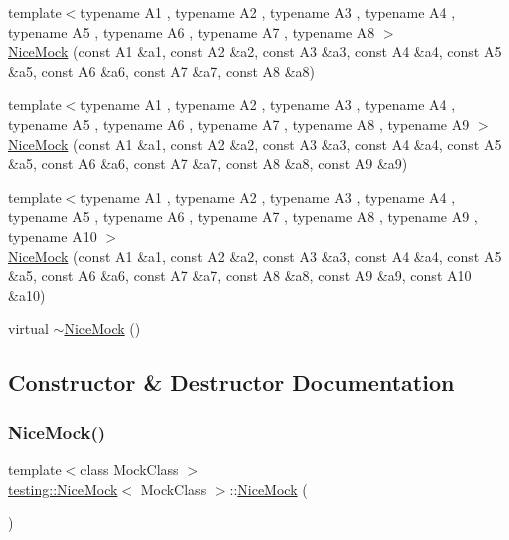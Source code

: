 \begin{DoxyCompactItemize}
\item 
{\footnotesize template$<$typename A1 , typename A2 , typename A3 , typename A4 , typename A5 , typename A6 , typename A7 , typename A8 $>$ }\\\hyperlink{classtesting_1_1_nice_mock_ae8792aab6c024a50886856bf1093eedc}{Nice\+Mock} (const A1 \&a1, const A2 \&a2, const A3 \&a3, const A4 \&a4, const A5 \&a5, const A6 \&a6, const A7 \&a7, const A8 \&a8)
\item 
{\footnotesize template$<$typename A1 , typename A2 , typename A3 , typename A4 , typename A5 , typename A6 , typename A7 , typename A8 , typename A9 $>$ }\\\hyperlink{classtesting_1_1_nice_mock_a61cfc9282222928590bcdaf851a806c6}{Nice\+Mock} (const A1 \&a1, const A2 \&a2, const A3 \&a3, const A4 \&a4, const A5 \&a5, const A6 \&a6, const A7 \&a7, const A8 \&a8, const A9 \&a9)
\item 
{\footnotesize template$<$typename A1 , typename A2 , typename A3 , typename A4 , typename A5 , typename A6 , typename A7 , typename A8 , typename A9 , typename A10 $>$ }\\\hyperlink{classtesting_1_1_nice_mock_a4baf1da52f4c892fc02f6ba10c0b8c02}{Nice\+Mock} (const A1 \&a1, const A2 \&a2, const A3 \&a3, const A4 \&a4, const A5 \&a5, const A6 \&a6, const A7 \&a7, const A8 \&a8, const A9 \&a9, const A10 \&a10)
\item 
virtual \hyperlink{classtesting_1_1_nice_mock_a4aaa6bd3850de6b6baa408010909a25f}{$\sim$\+Nice\+Mock} ()
\end{DoxyCompactItemize}


\subsection{Constructor \& Destructor Documentation}
\mbox{\label{classtesting_1_1_nice_mock_a10bbd6ebe779ac8ab1f9f3ae2dee9310}} 
\subsubsection{\texorpdfstring{Nice\+Mock()}{NiceMock()}\hspace{0.1cm}{\footnotesize\ttfamily [1/11]}}
{\footnotesize\ttfamily template$<$class Mock\+Class $>$ \\
\hyperlink{classtesting_1_1_nice_mock}{testing\+::\+Nice\+Mock}$<$ Mock\+Class $>$\+::\hyperlink{classtesting_1_1_nice_mock}{Nice\+Mock} (\begin{DoxyParamCaption}{ }\end{DoxyParamCaption})\hspace{0.3cm}{\ttfamily [inline]}}

